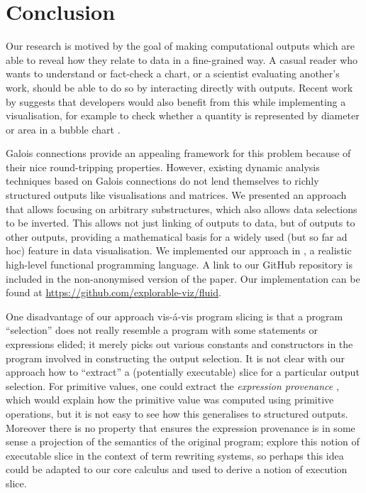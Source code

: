 \section{Conclusion}
\label{sec:conclusion}

Our research is motived by the goal of making computational outputs which are able to reveal how they relate to data in a fine-grained way. A casual reader who wants to understand or fact-check a chart, or a scientist evaluating another's work, should be able to do so by interacting directly with outputs. Recent work by \citeauthor{walny19} suggests that developers would also benefit from this while implementing a visualisation, for example to check whether a quantity is represented by diameter or area in a bubble chart \cite{walny19}.

Galois connections provide an appealing framework for this problem because of their nice round-tripping properties. However,  existing dynamic analysis techniques based on Galois connections do not lend themselves to richly structured outputs like visualisations and matrices. We presented an approach that allows focusing on arbitrary substructures, which also allows data selections to be inverted. This allows not just linking of outputs to data, but of outputs to other outputs, providing a mathematical basis for a widely used (but so far ad hoc) feature in data visualisation. We implemented our approach in \OurLanguage, a realistic high-level functional programming language. %
\makeatletter%
\if@ACM@anonymous%
   A link to our GitHub repository is included in the non-anonymised version of the paper.
\else%
   Our implementation can be found at \url{https://github.com/explorable-viz/fluid}.%
\fi%
\makeatother%

One disadvantage of our approach vis-\'a-vis program slicing is that a program ``selection'' does not really resemble a program with some statements or expressions elided; it merely picks out various constants and constructors in the program involved in constructing the output selection. It is not clear with our approach how to ``extract'' a (potentially executable) slice for a particular output selection. For primitive values, one could extract the \emph{expression provenance} \cite{acar12}, which would explain how the primitive value was computed using primitive operations, but it is not easy to see how this generalises to structured outputs. Moreover there is no property that ensures the expression provenance is in some sense a projection of the semantics of the original program; \citet{field98} explore this notion of executable slice in the context of term rewriting systems, so perhaps this idea could be adapted to our core calculus and used to derive a notion of execution slice.

